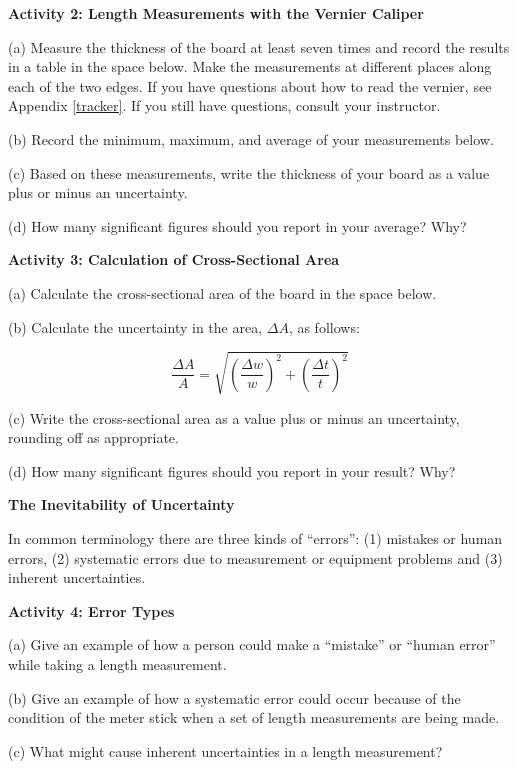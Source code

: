 \textbf{Activity 2: Length Measurements with the Vernier Caliper }

(a) Measure the thickness of the board at least seven times and record the results
in a table in the space below. Make the measurements at different places along
each of the two edges. If you have questions about how to read the vernier,
see Appendix \ref{tracker}. If you still have questions, consult your instructor.
\vspace{25mm}

(b) Record the minimum, maximum, and average of your measurements below.
\vspace{20mm}

(c) Based on these measurements, write the thickness of your board as a value plus or minus an uncertainty.
\vspace{15mm}

(d) How many significant figures should you report in your average? Why? 
\vspace{15mm}

\textbf{Activity 3: Calculation of Cross-Sectional Area} 

(a) Calculate the cross-sectional area of the board in the space below.
\vspace{15mm}

(b) Calculate the uncertainty in the area, \( \Delta  A\), as follows:

   $$ \frac{\Delta A}{A} = \sqrt{\left(\frac{\Delta w}{w}\right)^2 + \left(\frac{\Delta t}{t}\right)^2}$$
\vspace{20mm}

(c) Write the cross-sectional area as a value plus or minus an uncertainty, rounding off as appropriate.
\vspace{15mm}

(d) How many significant figures should you report in your result? Why?
\vspace{15mm}

\textbf{The Inevitability of Uncertainty} 

In common terminology there are three kinds of ``errors'': (1)
mistakes or human errors, (2) systematic errors due to measurement or equipment
problems and (3) inherent uncertainties.

\textbf{Activity 4: Error Types} 

(a) Give an example of how a person could make a ``mistake''
or ``human error'' while taking a length measurement.
\vspace{15mm}

(b) Give an example of how a systematic error could occur because of the condition
of the meter stick when a set of length measurements are being made.
\vspace{20mm}

(c) What might cause inherent uncertainties in a length measurement?

